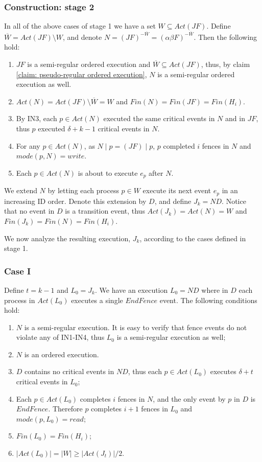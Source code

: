 \subsubsection{Construction: stage 2}
In all of the above cases of stage 1 we have a set $W \subseteq Act(J F)$. Define $\overline{W} = Act(J F) \setminus W$, and denote $N = (J F)^{-\overline{W}} = (\alpha \beta F)^{-\overline{W}}$. Then the following hold:
\begin{enumerate}
	\item $J F$ is a semi-regular ordered execution and $\overline{W} \subseteq Act(J F)$, thus, by claim \ref{claim: pseudo-regular ordered execution}, $N$ is a semi-regular ordered execution as well.
	\item $Act(N) = Act(J F) \setminus \overline{W} = W$ and $Fin(N) = Fin(J F) = Fin(H_i)$.
	\item By IN3, each $p \in Act(N)$ executed the same critical events in $N$ and in $J F$, thus $p$ executed $\delta+k-1$ critical events in $N$.
	\item For any $p\in Act(N)$, as $N \mid p = (J F) \mid p$, $p$ completed $i$ fences in $N$ and $mode(p,N) = write$.
	\item Each $p \in Act(N)$ is about to execute $e_p$ after $N$.
\end{enumerate}

We extend $N$ by letting each process $p \in W$ execute its next event $e_p$ in an increasing ID order. Denote this extension by $D$, and define $J_k = N D$. Notice that no event in $D$ is a transition event, thus $Act(J_k) = Act(N) = W$ and $Fin(J_k) = Fin(N) = Fin(H_i)$.

We now analyze the resulting execution, $J_k$, according to the cases defined in stage 1.
\subsubsection*{\hspace{5mm} Case I}
Define $t = k-1$ and $L_0= J_k$. We have an execution $L_0 = N D$ where in $D$ each process in $Act(L_0)$ executes a single $EndFence$ event. The following conditions hold:
\begin{enumerate}
	\item $N$ is a semi-regular execution. It is easy to verify that fence events do not violate any of IN1-IN4, thus $L_0$ is a semi-regular execution as well;
	\item $N$ is an ordered execution.
	\item $D$ contains no critical events in $N D$, thus each $p \in Act(L_0)$ executes $\delta+t$ critical events in $L_0$;
	\item Each $p \in Act(L_0)$ completes $i$ fences in $N$, and the only event by $p$ in $D$ is $EndFence$. Therefore $p$ completes $i+1$ fences in $L_0$ and $mode(p,L_0) = read$;
	\item $Fin(L_0) = Fin(H_i)$;
	\item $|Act(L_0)| = |W| \geq |Act(J_t)|/2$.
\end{enumerate}

